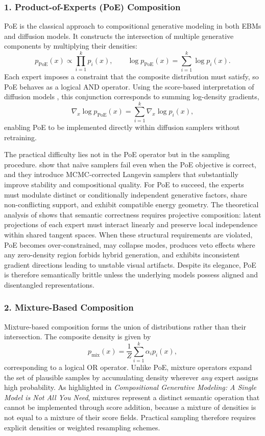 \subsubsection*{1. Product-of-Experts (PoE) Composition}

PoE is the classical approach to compositional generative modeling in both EBMs
and diffusion models. It constructs the intersection of multiple generative
components by multiplying their densities:
\[
p_{\mathrm{PoE}}(x) \propto \prod_{i=1}^k p_i(x),
\qquad
\log p_{\mathrm{PoE}}(x) = \sum_{i=1}^k \log p_i(x).
\]
Each expert imposes a constraint that the composite distribution must satisfy,
so PoE behaves as a logical AND operator. Using the score-based interpretation
of diffusion models \citep{NEURIPS2020_49856ed4}, this conjunction corresponds to
summing log-density gradients,
\[
\nabla_x \log p_{\mathrm{PoE}}(x)
    = \sum_{i=1}^k \nabla_x \log p_i(x),
\]
enabling PoE to be implemented directly within diffusion samplers without
retraining.

The practical difficulty lies not in the PoE operator but in the sampling
procedure. \citet{reduce_reuse_recycle_icml2023} show that naïve samplers fail even when the PoE
objective is correct, and they introduce MCMC-corrected Langevin samplers that
substantially improve stability and compositional quality. For PoE to succeed,
the experts must modulate distinct or conditionally independent generative
factors, share non-conflicting support, and exhibit compatible energy geometry.
The theoretical analysis of \citet{mechanisms2025projective} shows
that semantic correctness requires projective composition: latent projections of
each expert must interact linearly and preserve local independence within shared
tangent spaces. When these structural requirements are violated, PoE becomes
over-constrained, may collapse modes, produces veto effects where any
zero-density region forbids hybrid generation, and exhibits inconsistent
gradient directions leading to unstable visual artifacts. Despite its elegance,
PoE is therefore semantically brittle unless the underlying models possess
aligned and disentangled representations.

\vspace{1em}
\subsubsection*{2. Mixture-Based Composition}

Mixture-based composition forms the union of distributions rather than their
intersection. The composite density is given by
\[
p_{\mathrm{mix}}(x) = \frac{1}{Z} \sum_{i=1}^k \alpha_i p_i(x),
\]
corresponding to a logical OR operator. Unlike PoE, mixture operators expand the
set of plausible samples by accumulating density wherever \emph{any} expert
assigns high probability. As highlighted in \textit{Compositional Generative
Modeling: A Single Model is Not All You Need}, mixtures represent a distinct
semantic operation that cannot be implemented through score addition, because a
mixture of densities is not equal to a mixture of their score fields. Practical
sampling therefore requires explicit densities or weighted resampling schemes.

